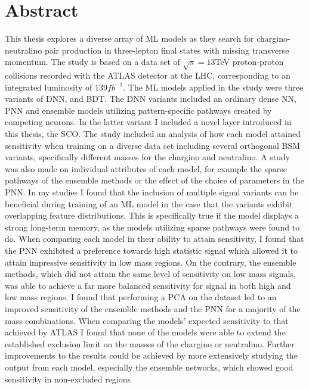 \chapter*{Abstract} 
This thesis explores a diverse array of \acf{ML} models as they search for chargino-neutralino pair production in 
three-lepton final states with missing transverse momentum. The study is based on a data set of $\sqrt{s} = 13$TeV proton-proton
collisions recorded with the \acs{ATLAS} detector at the \acs{LHC}, corresponding to an integrated luminosity of $139 fb^{-1}$. The \acs{ML} 
models applied in the study were three variants of \acf{DNN}, and \acf{BDT}. The \acs{DNN} variants included an ordinary 
dense \acf{NN}, \acf{PNN} and ensemble models utilizing pattern-specific pathways created by competing neurons. In the latter variant I 
included a novel layer introduced in this thesis, the \acf{SCO}. The study included an analysis of how each model attained sensitivity 
when training on a diverse data set including several orthogonal \acf{BSM} variants, specifically different masses for the chargino and neutralino. 
A study was also made on individual attributes of each model, for example the sparse pathways of the ensemble methods or the effect 
of the choice of parameters in the \acs{PNN}. In my studies I found that the inclusion of multiple signal variants can be beneficial during 
training of an \ac{ML} model in the case that the variants exhibit overlapping feature distributions. This is specifically true if 
the model displays a strong long-term memory, as the models utilizing sparse pathways were found to do. When comparing each 
model in their ability to attain sensitivity, I found that the \acs{PNN} exhibited a preference towards high statistic signal which allowed it 
to attain impressive sensitivity in low mass regions. On the contrary, the ensemble methods, which did not attain the same level of sensitivity 
on low mass signals, was able to achieve a far more balanced sensitivity for signal in both high and low mass regions. I found that performing a 
\acf{PCA} on the dataset led to an improved sensitivity of the ensemble methods and the \ac{PNN} for a majority of the mass combinations.
When comparing the models' expected sensitivity to that achieved by \acs{ATLAS} I found that none of the models were able to extend the established 
exclusion limit on the masses of the chargino or neutralino. Further improvements to the results could be achieved by more extensively studying the 
output from each model, especially the ensemble networks, which showed good sensitivity in non-excluded regions